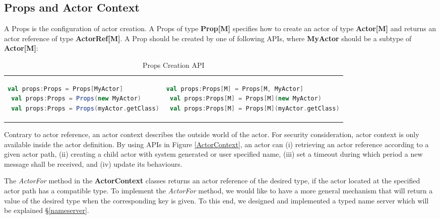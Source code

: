 \subsection{Props and Actor Context}
\label{actor_context}

A Props is the configuration of actor creation.  A Props of type {\bf Prop[M]}
specifies how to create an actor of type {\bf Actor[M]} and returns an actor
reference of type {\bf ActorRef[M]}.  A Prop should be created by one of
following APIs, where {\bf MyActor} should be a subtype of {\bf Actor[M]}:

\begin{table}[h]
\label{Props}
     \begin{adjustwidth}{-1.2cm}{}
  \begin{tabular}{ l  l }

\begin{lstlisting}[language=scala]
 val props:Props = Props[MyActor]
 val props:Props = Props(new MyActor)
 val props:Props = Props(myActor.getClass)
\end{lstlisting}
&
\begin{lstlisting}[language=scala]
 val props:Props[M] = Props[M, MyActor]
 val props:Props[M] = Props[M](new MyActor)
 val props:Props[M] = Props[M](myActor.getClass)
\end{lstlisting}
  \end{tabular}
     \end{adjustwidth}
    \caption{Props Creation API}
\end{table}
  

Contrary to actor reference, an actor context describes the outside world of the
actor.   For security consideration, actor context is only available inside the
actor definition.  By using APIs in Figure \ref{ActorContext}, an actor can (i)
retrieving an actor reference according to a given actor path, (ii) creating a
child actor with system generated or user specified name, (iii) set a timeout
during which period a new message shall be received, and (iv) update its
behaviours.

The {\it ActorFor} method in the {\bf ActorContext} classes returns an actor
reference of the desired type, if the actor located at the specified actor path
has a compatible type.  To implement the {\it ActorFor} method, we would like to
have a more general mechanism that will return a value of the desired type
when the corresponding key is given.  To this end, we designed and implemented a
typed name server which will be explained \S\ref{nameserver}.

